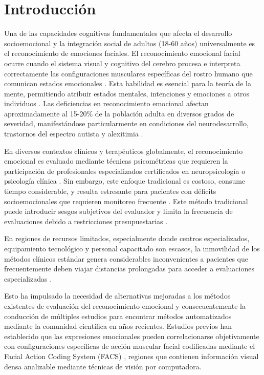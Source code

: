 \documentclass[journal,article,submit,pdftex,moreauthors]{Definitions/mdpi}
\begin{document}
	
	\section{Introducción}
	
	Una de las capacidades cognitivas fundamentales que afecta el desarrollo socioemocional y la integración social de adultos (18-60 años) universalmente es el reconocimiento de emociones faciales. El reconocimiento emocional facial ocurre cuando el sistema visual y cognitivo del cerebro procesa e interpreta correctamente las configuraciones musculares específicas del rostro humano que comunican estados emocionales \cite{ref11,ref12,ref33}. Esta habilidad es esencial para la teoría de la mente, permitiendo atribuir estados mentales, intenciones y emociones a otros individuos \cite{ref31}. Las deficiencias en reconocimiento emocional afectan aproximadamente al 15-20\% de la población adulta en diversos grados de severidad, manifestándose particularmente en condiciones del neurodesarrollo, trastornos del espectro autista y alexitimia \cite{ref7,ref9,ref13}.
	
	En diversos contextos clínicos y terapéuticos globalmente, el reconocimiento emocional es evaluado mediante técnicas psicométricas que requieren la participación de profesionales especializados certificados en neuropsicología o psicología clínica \cite{ref14,ref26,ref31}. Sin embargo, este enfoque tradicional es costoso, consume tiempo considerable, y resulta estresante para pacientes con déficits socioemocionales que requieren monitoreo frecuente \cite{ref26}. Este método tradicional puede introducir sesgos subjetivos del evaluador y limita la frecuencia de evaluaciones debido a restricciones presupuestarias \cite{ref18}.
	
	En regiones de recursos limitados, especialmente donde centros especializados, equipamiento tecnológico y personal capacitado son escasos, la inmovilidad de los métodos clínicos estándar genera considerables inconvenientes a pacientes que frecuentemente deben viajar distancias prolongadas para acceder a evaluaciones especializadas \cite{ref27}.
	
	Esto ha impulsado la necesidad de alternativas mejoradas a los métodos existentes de evaluación del reconocimiento emocional y consecuentemente la conducción de múltiples estudios para encontrar métodos automatizados mediante la comunidad científica en años recientes. Estudios previos han establecido que las expresiones emocionales pueden correlacionarse objetivamente con configuraciones específicas de acción muscular facial codificadas mediante el Facial Action Coding System (FACS) \cite{ref33,ref11,ref12,ref22}, regiones que contienen información visual densa analizable mediante técnicas de visión por computadora.
	
\end{document}

